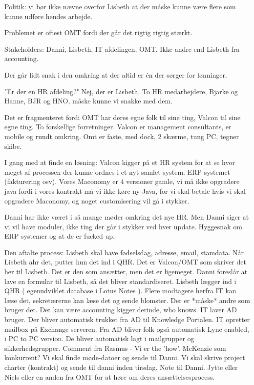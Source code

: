 Politik: vi bør ikke nævne overfor Lisbeth at der måske kunne være flere som kunne udføre hendes arbejde.

Problemet er oftest OMT fordi der går det rigtig rigtig stærkt.


Stakeholders: Danni, Lisbeth, IT afdelingen, OMT. Ikke andre end Lisbeth fra accounting.


Der går lidt snak i den omkring at der altid er én der sørger for lønninger.


"Er der en HR afdeling?" Nej, der er Lisbeth. To HR medarbejdere, Bjarke og Hanne, BJR og HNO, måske kunne vi snakke med dem.


Det er fragmenteret fordi OMT har deres egne folk til sine ting, Valcon til sine egne ting. To forskellige forretninger. Valcon er management consultants, er mobile og rundt omkring. Omt er faste, med dock, 2 skærme, tung PC, tegner skibe.


I gang med at finde en løsning: Valcon kigger på et HR system for at se hvor meget af processen der kunne ordnes i et nyt samlet system. 
ERP systemet (fakturering osv). Vores Maconomy er 4 versioner gamle, vi må ikke opgradere java fordi i vores kontrakt må vi ikke køre ny Java, for vi skal betale hvis vi skal opgradere Maconomy, og noget customisering vil gå i stykker.


Danni har ikke været i så mange møder omkring det nye HR. Men Danni siger at vi vil have moduler, ikke ting der går i stykker ved hver update.
Hyggesnak om ERP systemer og at de er fucked up.


Den aftalte process: Lisbeth skal have fødselsdag, adresse, email, stamdata. Når Lisbeth ahr det, putter hun det ind i QHR. Det er Valcon/OMT som skriver det her til Lisbeth. Det er den som ansætter, men det er ligemeget.
Danni foreslår at lave en formular til Lisbeth, så det bliver standardiseret.
Lisbeth lægger ind i QHR ( egenudviklet database i Lotus Notes ). Flere modtagere herfra
IT kan læse det, sekretærerne kan læse det og sende blomster. Der er *måske* andre som bruger det. Det kan være accounting kigger derinde, who knows.
IT laver AD bruger. Der bliver automatisk trukket fra AD til Knowledge Portalen. IT opretter mailbox på Exchange serveren. Fra AD bliver folk også automatisk Lync enabled, i PC to PC version. De bliver automatisk lagt i mailgrupper og sikkerhedsgrupper.
Comment fra Rasmus - Vi er the 'how'. McKenzie som konkurrent?
Vi skal finde møde-datoer og sende til Danni. Vi skal skrive project charter (kontrakt) og sende til danni inden tirsdag.
Note til Danni. Jytte eller Niels eller en anden fra OMT for at høre om deres ansættelsesprocess.
